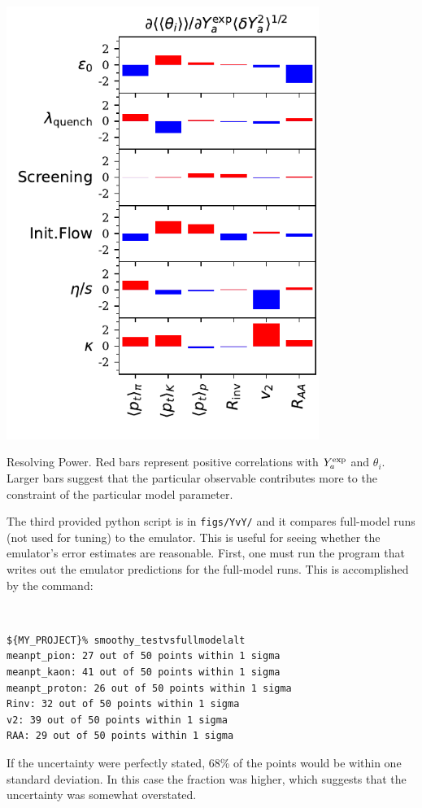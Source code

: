 \documentclass[UserManual.tex]{subfiles}
\begin{document}
\parbox{4.0in}{\centerline{\includegraphics[width=4.0in]{RP_rhic.pdf}}}
\parbox{2.5in}{Resolving Power. Red bars represent positive correlations with $Y^{\rm exp}_a$ and $\theta_i$. Larger bars suggest that the particular observable contributes more to the constraint of the particular model parameter.}

The third provided python script is in {\tt figs/YvY/} and it compares full-model runs (not used for tuning) to the emulator. This is useful for seeing whether the emulator's error estimates are reasonable. First, one must run the program that writes out the emulator predictions for the full-model runs. This is accomplished by the command:
{\tt
\begin{verbatim}
${MY_PROJECT}% smoothy_testvsfullmodelalt
meanpt_pion: 27 out of 50 points within 1 sigma
meanpt_kaon: 41 out of 50 points within 1 sigma
meanpt_proton: 26 out of 50 points within 1 sigma
Rinv: 32 out of 50 points within 1 sigma
v2: 39 out of 50 points within 1 sigma
RAA: 29 out of 50 points within 1 sigma
\end{verbatim}}
If the uncertainty were perfectly stated, 68\% of the points would be within one standard deviation. In this case the fraction was higher, which suggests that the uncertainty was somewhat overstated.
\end{document}
